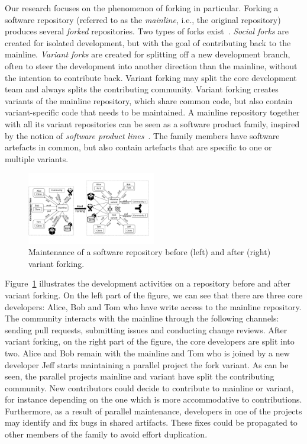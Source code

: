 Our research focuses on the phenomenon of forking in particular.
Forking a software repository (referred to as the \textit{mainline}, i.e., the original repository) produces several \textit{forked} repositories.
Two types of forks exist~\cite{Zhou:2020}. \textit{Social forks} are created for isolated development, but with the goal of contributing back to the mainline.
\textit{Variant forks} are created for splitting off a new development branch, often to steer the development into another direction than the mainline, without the intention to contribute back.
Variant forking may split the core development team and always splits the contributing community.
Variant forking creates variants of the mainline repository, which share common code, but also contain variant-specific code that needs to be maintained.
A mainline repository together with all its variant repositories can be seen as a software product family, inspired by the notion of \textit{software product lines}~\cite{berger.ea:2020:emse}.
The  family members have software artefacts in common, but also contain artefacts that are specific to one or multiple variants.

\begin{figure}[ht]
  \begin{center}
  \small
    \includegraphics[width=0.5\textwidth]{figures/Collaboration.pdf}
  \end{center}
  \caption{Maintenance of a software repository before (left) and after (right) variant forking.}
  \label{fig:forking}
\end{figure}

Figure~\ref{fig:forking} illustrates the development activities on a repository before and after variant forking.
On the left part of the figure, we can see that there are three core developers: Alice, Bob and Tom who have write access to the mainline repository.
The community interacts with the mainline through the following channels: sending pull requests, submitting issues and conducting change reviews.
After variant forking, on the right part of the figure, the core developers are split into two.
Alice and Bob remain with the mainline and Tom who is joined by a new developer Jeff starts maintaining a parallel project the fork variant.
As can be seen, the parallel projects mainline and variant have split the contributing community. New contributors could decide to contribute to mainline or variant, for instance depending on the one which is more accommodative to contributions.
Furthermore, as a result of parallel maintenance, developers in one of the projects may identify and fix bugs in shared artifacts.
These fixes could be propagated to other members of the family to avoid effort duplication.

